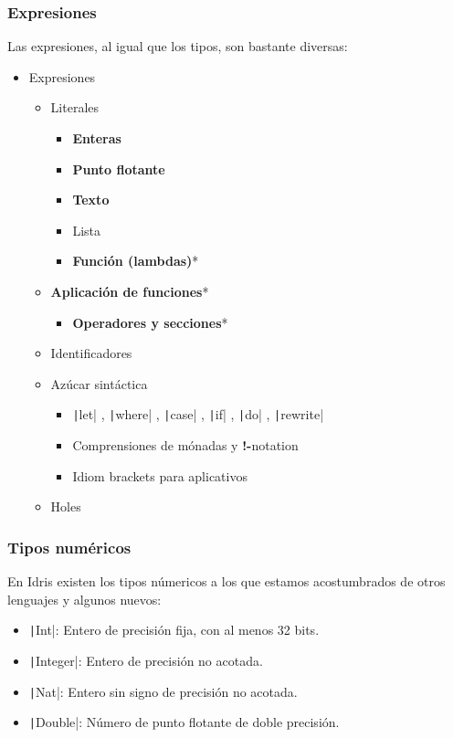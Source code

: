 \documentclass{beamer}
\begin{document}
\begin{frame}[fragile]
  \frametitle{Expresiones}

  Las expresiones, al igual que los tipos, son bastante diversas:

  \begin{itemize}
    \item Expresiones
      \begin{itemize}
        \item Literales
          \begin{itemize}
            \item \textbf{Enteras}
            \item \textbf{Punto flotante}
            \item \textbf{Texto}
            \item Lista
            \item \textbf{Función (lambdas)}*
          \end{itemize}
        \item \textbf{Aplicación de funciones}*
          \begin{itemize}
            \item \textbf{Operadores y secciones}*
          \end{itemize}
        \item Identificadores
        \item Azúcar sintáctica
          \begin{itemize}
            \item \texttt|let|
              , \texttt|where|
              , \texttt|case|
              , \texttt|if|
              , \texttt|do|
              , \texttt|rewrite|
            \item Comprensiones de mónadas y \textbf{!-}notation
            \item Idiom brackets para aplicativos
          \end{itemize}
        \item Holes
      \end{itemize}
  \end{itemize}
\end{frame}

\begin{frame}
  \frametitle{Tipos numéricos}

  En Idris existen los tipos númericos a los que estamos
  acostumbrados de otros lenguajes y algunos nuevos:
  \begin{itemize}
    \item \texttt|Int|: Entero de precisión fija, con al menos 32 bits.
    \item \texttt|Integer|: Entero de precisión no acotada.
    \item \texttt|Nat|: Entero sin signo de precisión no acotada.
    \item \texttt|Double|: Número de punto flotante de doble precisión.
  \end{itemize}
\end{frame}
\end{document}

